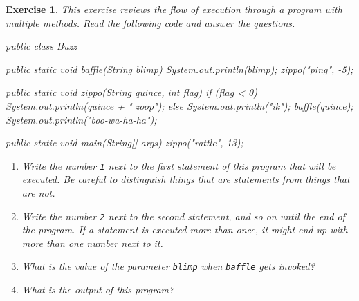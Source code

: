 \documentclass[12pt]{book}
\theoremstyle{exercise}
\newtheorem{exercise}{Exercise}[chapter]
\begin{document}
\begin{exercise}
This exercise reviews the flow of execution through a program with multiple methods.
Read the following code and answer the questions.

\begin{code}
public class Buzz {

    public static void baffle(String blimp) {
        System.out.println(blimp);
        zippo("ping", -5);
    }

    public static void zippo(String quince, int flag) {
        if (flag < 0) {
            System.out.println(quince + " zoop");
        } else {
            System.out.println("ik");
            baffle(quince);
            System.out.println("boo-wa-ha-ha");
        }
    }

    public static void main(String[] args) {
        zippo("rattle", 13);
    }

}
\end{code}

\begin{enumerate}

\item Write the number {\tt 1} next to the first {\em statement} of this program that will be executed.
Be careful to distinguish things that are statements from things that are not.

\item Write the number {\tt 2} next to the second statement, and so on until the end of the program.
If a statement is executed more than once, it might end up with more than one number next to it.

\item What is the value of the parameter {\tt blimp} when {\tt baffle} gets invoked?

\item What is the output of this program?

\end{enumerate}
\end{exercise}
\end{document}
